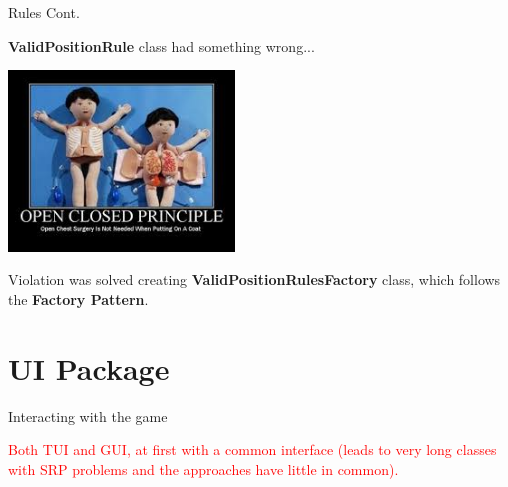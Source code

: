 \documentclass{beamer}
\begin{document}
  \begin{frame} {Rules Cont.}

    \textbf{ValidPositionRule} class had something wrong...

    \vspace{1em}


    \pause
    \hfill
    \includegraphics[width=0.45\textwidth]{img/openclosedprinciple.jpeg}

    \pause

    \vspace{1em}

    Violation was solved creating \textbf{ValidPositionRulesFactory} class, which follows the \textbf{Factory Pattern}.

  \end{frame}


\section{UI Package}


  \begin{frame}{Interacting with the game}

    \textcolor{red}{Both TUI and GUI, at first with a common interface (leads to very long classes with SRP problems and the approaches have little in common).}

  \end{frame}
\end{document}

